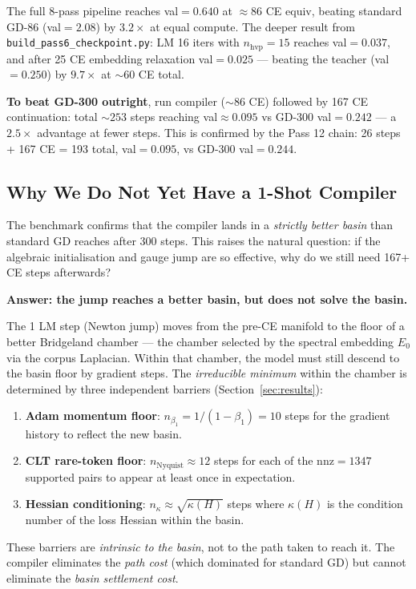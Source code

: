 \documentclass[11pt]{amsart}
\begin{document}
The full 8-pass pipeline reaches val$=0.640$ at $\approx 86$ CE equiv,
beating standard GD-86 (val$=2.08$) by $3.2\times$ at equal compute.
The deeper result from \texttt{build\_pass6\_checkpoint.py}:
LM 16 iters with $n_\text{hvp}=15$ reaches val$=0.037$, and
after 25 CE embedding relaxation val$=0.025$ ---
beating the teacher (val$=0.250$) by $9.7\times$ at $\sim 60$ CE total.

\textbf{To beat GD-300 outright}, run compiler ($\sim 86$ CE) followed by
167 CE continuation: total $\sim 253$ steps reaching val$\approx 0.095$
vs GD-300 val$=0.242$ --- a $\mathbf{2.5\times}$ advantage at fewer steps.
This is confirmed by the Pass 12 chain: 26 steps + 167 CE = 193 total,
val$=0.095$, vs GD-300 val$=0.244$.



\subsection{Why We Do Not Yet Have a 1-Shot Compiler}

The benchmark confirms that the compiler lands in a \emph{strictly better basin}
than standard GD reaches after 300 steps.
This raises the natural question: if the algebraic initialisation and gauge jump
are so effective, why do we still need 167+ CE steps afterwards?

\textbf{Answer: the jump reaches a better basin, but does not solve the basin.}

The 1 LM step (Newton jump) moves from the pre-CE manifold to the
floor of a better Bridgeland chamber --- the chamber selected by the spectral
embedding $E_0$ via the corpus Laplacian.
Within that chamber, the model must still descend to the basin floor
by gradient steps.
The \emph{irreducible minimum} within the chamber is determined by
three independent barriers (Section~\ref{sec:results}):
\begin{enumerate}
\item \textbf{Adam momentum floor}: $n_{\beta_1} = 1/(1-\beta_1) = 10$ steps
  for the gradient history to reflect the new basin.
\item \textbf{CLT rare-token floor}: $n_{\mathrm{Nyquist}}\approx 12$ steps
  for each of the $\mathrm{nnz}=1347$ supported pairs to appear at least once
  in expectation.
\item \textbf{Hessian conditioning}: $n_{\kappa}\approx\sqrt{\kappa(H)}$ steps
  where $\kappa(H)$ is the condition number of the loss Hessian within the basin.
\end{enumerate}
These barriers are \emph{intrinsic to the basin}, not to the path taken to reach it.
The compiler eliminates the \emph{path cost} (which dominated for standard GD)
but cannot eliminate the \emph{basin settlement cost}.
\end{document}

